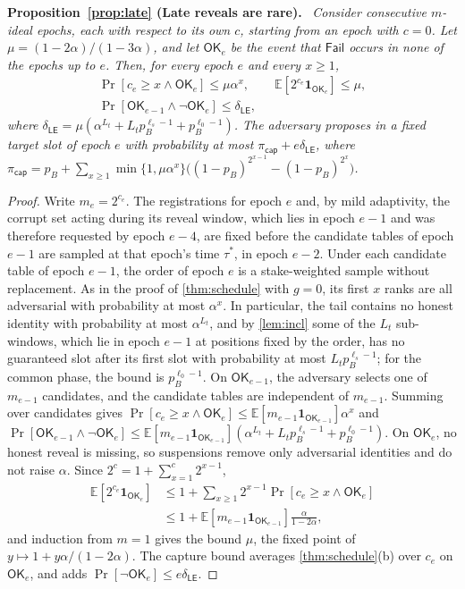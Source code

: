 \documentclass[10pt,journal,compsoc]{IEEEtran}
\theoremstyle{tplain}
\theoremstyle{tdef}
\theoremstyle{remark}
\newenvironment{restate}[1]{\par\smallskip\noindent\textbf{#1.}\ \itshape\ignorespaces}{\par\smallskip}
\begin{document}
\begin{restate}{Proposition~\ref{prop:late} (Late reveals are rare)}
Consider consecutive $m$-ideal epochs, each with respect to its own $c$, starting from an epoch with $c=0$. Let $\mu=(1-2\alpha)/(1-3\alpha)$, and let $\mathsf{OK}_e$ be the event that $\mathsf{Fail}$ occurs in none of the epochs up to $e$. Then, for every epoch $e$ and every $x\ge1$,
\begin{gather*}
\Pr[c_e\ge x\wedge\mathsf{OK}_e]\le\mu\alpha^x,\qquad\mathbb E[2^{c_e}\mathbf 1_{\mathsf{OK}_e}]\le\mu,\\
\Pr[\mathsf{OK}_{e-1}\wedge\neg\mathsf{OK}_e]\le\delta_{\mathsf{LE}},
\end{gather*}
where $\delta_{\mathsf{LE}}=\mu(\alpha^{L_t}+L_tp_B^{\ell_s-1}+p_B^{\ell_0-1})$. The adversary proposes in a fixed target slot of epoch $e$ with probability at most $\pi_{\mathsf{cap}}+e\delta_{\mathsf{LE}}$, where $\pi_{\mathsf{cap}}=p_B+\sum_{x\ge1}\min\{1,\mu\alpha^x\}\big((1-p_B)^{2^{x-1}}-(1-p_B)^{2^x}\big)$.
\end{restate}
\begin{proof}
Write $m_e=2^{c_e}$. The registrations for epoch $e$ and, by mild adaptivity, the corrupt set acting during its reveal window, which lies in epoch $e-1$ and was therefore requested by epoch $e-4$, are fixed before the candidate tables of epoch $e-1$ are sampled at that epoch's time $\tau^\ast$, in epoch $e-2$. Under each candidate table of epoch $e-1$, the order of epoch $e$ is a stake-weighted sample without replacement. As in the proof of \cref{thm:schedule} with $g=0$, its first $x$ ranks are all adversarial with probability at most $\alpha^x$. In particular, the tail contains no honest identity with probability at most $\alpha^{L_t}$, and by \cref{lem:incl} some of the $L_t$ sub-windows, which lie in epoch $e-1$ at positions fixed by the order, has no guaranteed slot after its first slot with probability at most $L_tp_B^{\ell_s-1}$; for the common phase, the bound is $p_B^{\ell_0-1}$. On $\mathsf{OK}_{e-1}$, the adversary selects one of $m_{e-1}$ candidates, and the candidate tables are independent of $m_{e-1}$. Summing over candidates gives $\Pr[c_e\ge x\wedge\mathsf{OK}_e]\le\mathbb E[m_{e-1}\mathbf 1_{\mathsf{OK}_{e-1}}]\alpha^x$ and $\Pr[\mathsf{OK}_{e-1}\wedge\neg\mathsf{OK}_e]\le\mathbb E[m_{e-1}\mathbf 1_{\mathsf{OK}_{e-1}}](\alpha^{L_t}+L_tp_B^{\ell_s-1}+p_B^{\ell_0-1})$. On $\mathsf{OK}_e$, no honest reveal is missing, so suspensions remove only adversarial identities and do not raise $\alpha$. Since $2^{c}=1+\sum_{x=1}^{c}2^{x-1}$,
\begin{align*}
\mathbb E[2^{c_e}\mathbf 1_{\mathsf{OK}_e}]&\le1+\sum_{x\ge1}2^{x-1}\Pr[c_e\ge x\wedge\mathsf{OK}_e]\\
&\le 1+\mathbb E[m_{e-1}\mathbf 1_{\mathsf{OK}_{e-1}}]\frac{\alpha}{1-2\alpha},
\end{align*}
and induction from $m=1$ gives the bound $\mu$, the fixed point of $y\mapsto 1+y\alpha/(1-2\alpha)$. The capture bound averages \cref{thm:schedule}(b) over $c_e$ on $\mathsf{OK}_e$, and adds $\Pr[\neg\mathsf{OK}_e]\le e\delta_{\mathsf{LE}}$.
\end{proof}
\end{document}
